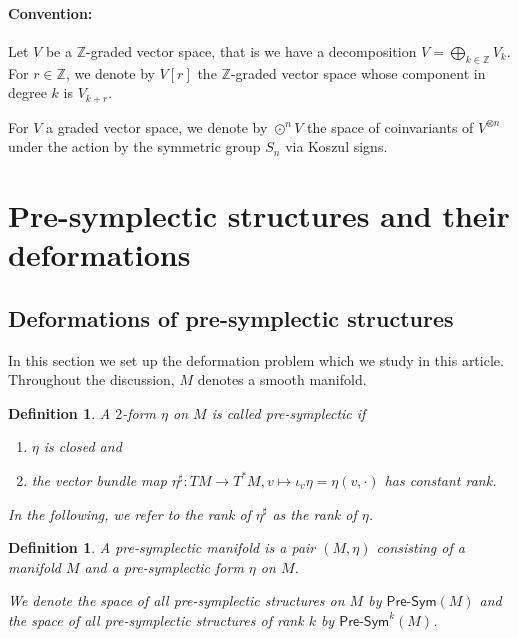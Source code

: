 \documentclass[11pt,thmsa]{amsart}
\newtheorem{definition}[theorem]{Definition}
\theoremstyle{definition}
\newcommand{\Presym}{\mathsf{Pre}\textrm{-}\mathsf{Sym}}
\begin{document}
\paragraph{\bf Convention:}
Let $V$ be a $\mathbb{Z}$-graded vector space, that is we have a decomposition $V=\bigoplus_{k\in \mathbb{Z}}V_k$.
For $r\in \mathbb{Z}$, we denote by $V[r]$ the $\mathbb{Z}$-graded vector space whose component in degree $k$ is $V_{k+r}$.

For $V$ a graded vector space, we denote by $\odot^nV$ the space of coinvariants of $V^{\otimes n}$ under the action by the symmetric group $S_n$ via Koszul signs.



\section{\textsf{Pre-symplectic structures and their deformations}}\label{section: pre-symplectic structures}



\subsection{Deformations of pre-symplectic structures}
\label{subsection: pre-symplectic structures}

In this section we set up the deformation problem which we study in this article. Throughout the discussion, $M$ denotes a smooth manifold.


\begin{definition}\label{definition: pre-symplectic}
A $2$-form $\eta$ on $M$ is called \emph{pre-symplectic} if 
\begin{enumerate}
\item $\eta$ is closed and
\item the vector bundle map $\eta^\sharp: TM \to T^*M, v\mapsto \iota_v\eta = \eta(v,\cdot)$ has constant rank.
\end{enumerate}
In the following, we refer to the rank of $\eta^\sharp$ as the rank of $\eta$.
\end{definition}

\begin{definition}
A \emph{pre-symplectic} manifold is a pair $(M,\eta)$ consisting of a manifold $M$
and a pre-symplectic form $\eta$ on $M$.

We denote the space of all pre-symplectic structures on $M$ by 
$\Presym(M)$ and the space of all pre-symplectic structures of rank $k$
by $\Presym^k(M)$.
\end{definition}
\end{document}
